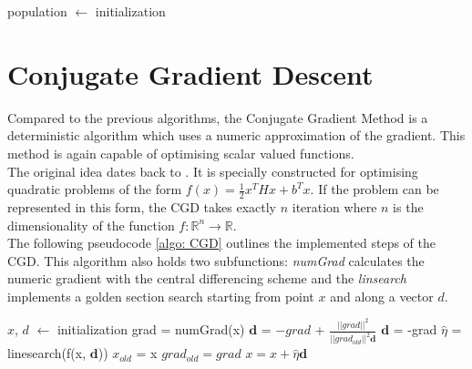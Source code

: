 \documentclass[./\jobname.tex]{subfiles}
\begin{document}
\begin{algorithm}[H]
	\SetAlgoNoLine
	\DontPrintSemicolon
	population $\gets$ initialization\;
	\label{algo: NSGA2}
\end{algorithm}



\section{Conjugate Gradient Descent}
Compared to the previous algorithms, the Conjugate Gradient Method is a deterministic algorithm which uses a numeric approximation of the gradient. This method is again capable of optimising scalar valued functions. \\
The original idea dates back to \cite{hestenes_methods_1952}. It is specially constructed for optimising quadratic problems of the form $f(x) = \frac{1}{2}x^T H x + b^T x$. If the problem can be represented in this form, the CGD takes exactly $n$ iteration where $n$ is the dimensionality of the function $f: \mathbb{R}^n \rightarrow \mathbb{R}$. \\
The following pseudocode \ref{algo: CGD} outlines the implemented steps of the CGD. This algorithm also holds two subfunctions: \textit{numGrad} calculates the numeric gradient with the central differencing scheme and the \textit{linsearch} implements a golden section search starting from point $x$ and along a vector $d$. 

\begin{algorithm}
	\SetAlgoNoLine
	\DontPrintSemicolon
	$x$, $d$ $\gets$ initialization\;
	{
		grad = numGrad(x)\;
		$\textbf{d}$ = $-grad$ + $\frac{||grad||^2}{||grad_{old}||^2 \textbf{d}}$\;
		{
			$\textbf{d}$ = -grad\;
		}
		$\hat{\eta}$ = linesearch(f(x, $\textbf{d}$))\;
		$x_{old}$ = x\;
		$grad_{old} = grad$\;
		$x = x + \hat{\eta} \textbf{d}$\;
	}
	\label{algo: CGD}
\end{algorithm}
\end{document}

